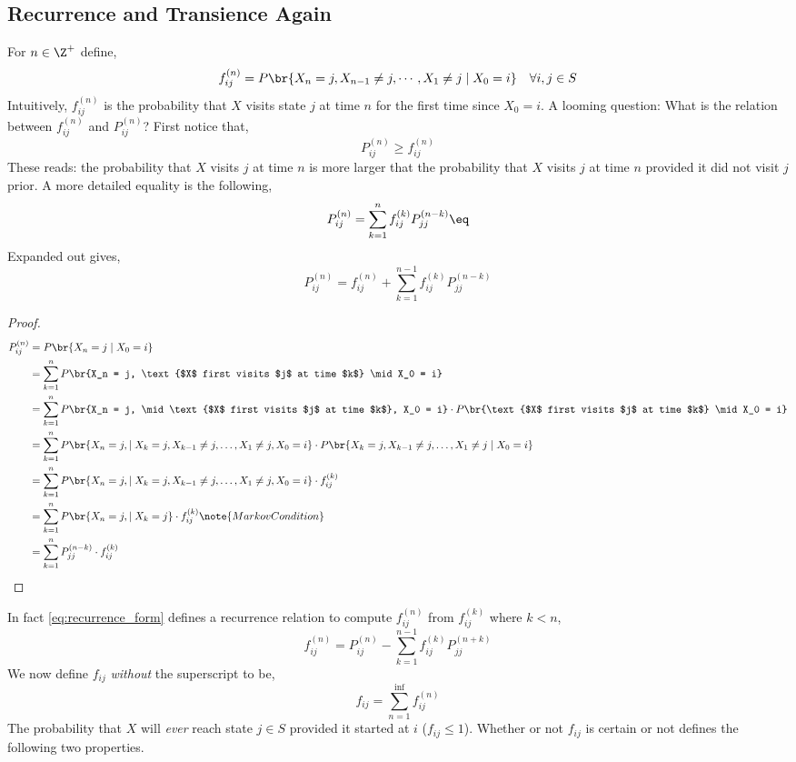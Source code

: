 \documentclass{article}
\begin{document}
\subsection{Recurrence and Transience Again}
For $n \in \Z^{+}$ define,
\[ f_{ij}^{(n)} = P \br{X_n = j, X_{n-1} \neq j, \cdots, X_{1} \neq j \mid X_0 = i} \quad \forall i,j \in S \]
Intuitively, $f_{ij}^{(n)}$ is the probability that $X$ visits state $j$ at time $n$ for the first time since $X_0 = i$. A looming question: What is the relation between $f_{ij}^{(n)}$ and $P_{ij}^{(n)}$? First notice that,
\[ P_{ij}^{(n)} \geq f_{ij}^{(n)} \]
These reads: the probability that $X$ visits $j$ at time $n$ is more larger that the probability that $X$ visits $j$ at time $n$ provided it did not visit $j$ prior. A more detailed equality is the following,
\[ P_{ij}^{(n)} = \sum_{k = 1}^{n} f_{ij}^{(k)}P_{jj}^{(n-k)} \eq \label{eq:recurrence_form}\]
Expanded out gives,
\[ P_{ij}^{(n)} = f_{ij}^{(n)} + \sum_{k = 1}^{n-1} f_{ij}^{(k)}P_{jj}^{(n-k)} \]
\begin{proof}
\begin{align*}
P_{ij}^{(n)} & = P\br{X_n = j \mid X_0 = i} \\
& = \sum_{k=1}^{n} P\br{X_n = j, \text{$X$ first visits $j$ at time $k$} \mid X_0 = i} \\
& = \sum_{k=1}^{n} P\br{X_n = j, \mid \text{$X$ first visits $j$ at time $k$}, X_0 = i} \cdot P\br{\text{$X$ first visits $j$ at time $k$} \mid X_0 = i} \\
& = \sum_{k=1}^{n} P\br{X_n = j, \mid X_k = j, X_{k-1} \neq j, \ldots, X_{1} \neq j, X_0 = i} \cdot P\br{X_k = j, X_{k-1} \neq j, \ldots, X_{1} \neq j \mid X_0 = i} \\
& = \sum_{k=1}^{n} P\br{X_n = j, \mid X_k = j, X_{k-1} \neq j, \ldots, X_{1} \neq j, X_0 = i} \cdot f_{ij}^{(k)} \\
& = \sum_{k=1}^{n} P\br{X_n = j, \mid X_k = j} \cdot f_{ij}^{(k)} \note{Markov Condition} \\
& = \sum_{k=1}^{n} P^{(n-k)}_{jj} \cdot f_{ij}^{(k)}
\end{align*}
\end{proof}
In fact \cref{eq:recurrence_form} defines a recurrence relation to compute $f_{ij}^{(n)}$ from $f_{ij}^{(k)}$ where $k < n$,
\[ f_{ij}^{(n)} = P_{ij}^{(n)} - \sum_{k=1}^{n-1} f_{ij}^{(k)} P_{jj}^{(n+k)} \]
We now define $f_{ij}$ \textit{without} the superscript to be,
\[ f_{ij} = \sum_{n=1}^{\inf} f_{ij}^{(n)} \]
The probability that $X$ will \textit{ever} reach state $j \in S$ provided it started at $i$ ($f_{ij} \leq 1$). Whether or not $f_{ij}$ is certain or not defines the following two properties.\\
\end{document}
